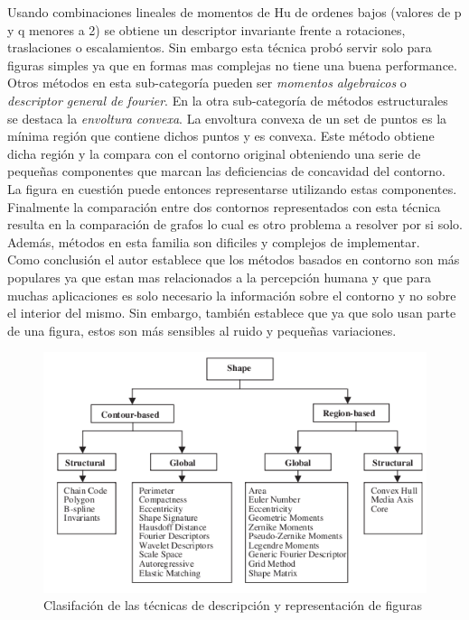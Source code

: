 Usando combinaciones lineales de momentos de Hu de ordenes bajos 
(valores de p y q menores a 2) se obtiene un descriptor 
invariante frente a rotaciones, traslaciones o escalamientos. Sin embargo esta técnica probó servir solo 
para figuras simples ya que en formas mas complejas no tiene una buena performance. Otros métodos en esta
sub-categoría pueden ser \textit{momentos algebraicos} o \textit{descriptor general de fourier}. En la otra sub-categoría de métodos
estructurales se destaca la \textit{envoltura convexa}. La envoltura convexa de un set de puntos es la mínima región que contiene 
dichos puntos y es convexa. Este método obtiene dicha región y la compara con el contorno original obteniendo una serie de pequeñas
componentes que marcan las deficiencias de concavidad del contorno. La 
figura en cuestión puede entonces representarse utilizando estas componentes.
Finalmente la comparación entre dos contornos representados con esta 
técnica resulta en la comparación de grafos lo cual es otro
problema a resolver por si solo. Además, métodos en esta familia son dificiles y complejos de implementar.\\
\indent Como conclusión el autor establece que los métodos basados en contorno son más populares ya que estan mas relacionados
a la percepción humana y que para muchas aplicaciones es solo necesario la información sobre el contorno y no sobre el interior del mismo.
Sin embargo, también establece que ya que solo usan parte de una figura, estos son más sensibles al ruido y pequeñas variaciones.

\begin{figure}[tpb]
\begin{center}
  \includegraphics[scale=0.55]{figuras/shapess.png}
\end{center}
  \caption{Clasifación de las técnicas de descripción y representación de figuras}
  \label{fig:review_shape}
\end{figure}

